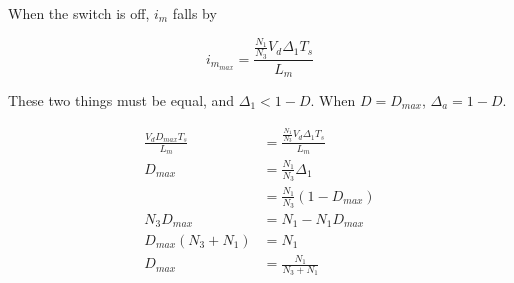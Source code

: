When the switch is off, $i_m$ falls by

$$
i_{m_{max}} = \frac{\frac{N_1}{N_3}V_d \Delta_1 T_s}{L_m}
$$

These two things must be equal, and $\Delta_1 < 1-D$. 
When $D=D_{max}$, $\Delta_a = 1-D$.

\begin{align*}
\frac{V_d D_{max} T_s}{L_m} & = \frac{\frac{N_1}{N_3}V_d \Delta_1 T_s}{L_m} \\
D_{max} & = \frac{N_1}{N_3}\Delta_1\\
  & = \frac{N_1}{N_3}(1-D_{max})\\
N_3 D_{max} & = N_1 - N_1 D_{max} \\
D_{max}(N_3 + N_1) & = N_1 \\
D_{max} & = \frac{N_1}{N_3 + N_1}
\end{align*}